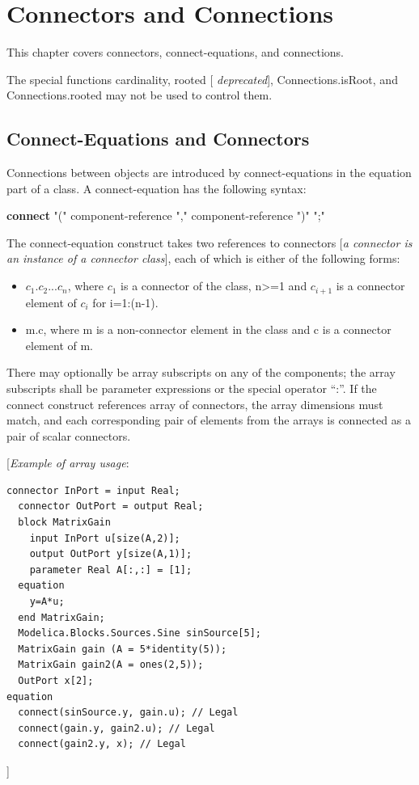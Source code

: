 \documentclass[10pt,a4paper]{report}
\def\doublelabel#1{\label{#1}}
\begin{document}
\chapter{Connectors and Connections}\doublelabel{connectors-and-connections}

This chapter covers connectors, connect-equations, and connections.

The special functions cardinality, rooted {[} \emph{deprecated}{]},
Connections.isRoot, and Connections.rooted may not be used to control
them.

\section{Connect-Equations and Connectors}\doublelabel{connect-equations-and-connectors}

Connections between objects are introduced by connect-equations in the
equation part of a class. A connect-equation has the following syntax:

\textbf{connect} "(" component-reference "," component-reference ")" ";"

The connect-equation construct takes two references to connectors
{[}\emph{a connector is an instance of a connector class}{]}, each of
which is either of the following forms:

\begin{itemize}
\item
  $c_1.c_2...c_n$,
  where $c_1$ is a connector of the class,
  n\textgreater{}=1 and $c_{i+1}$ is a connector element of
  $c_i$ for i=1:(n-1).
\item
  m.c, where m is a non-connector element in the class and c is a
  connector element of m.
\end{itemize}

There may optionally be array subscripts on any of the components; the
array subscripts shall be parameter expressions or the special operator
``:''. If the connect construct references array of connectors, the
array dimensions must match, and each corresponding pair of elements
from the arrays is connected as a pair of scalar connectors.

{[}\emph{Example of array usage}:

\begin{lstlisting}[language=modelica]
  connector InPort = input Real;
  connector OutPort = output Real;
  block MatrixGain
    input InPort u[size(A,2)];
    output OutPort y[size(A,1)];
    parameter Real A[:,:] = [1];
  equation
    y=A*u;
  end MatrixGain;
  Modelica.Blocks.Sources.Sine sinSource[5];
  MatrixGain gain (A = 5*identity(5));
  MatrixGain gain2(A = ones(2,5));
  OutPort x[2];
equation
  connect(sinSource.y, gain.u); // Legal
  connect(gain.y, gain2.u); // Legal
  connect(gain2.y, x); // Legal
\end{lstlisting}
{]}
\end{document}
